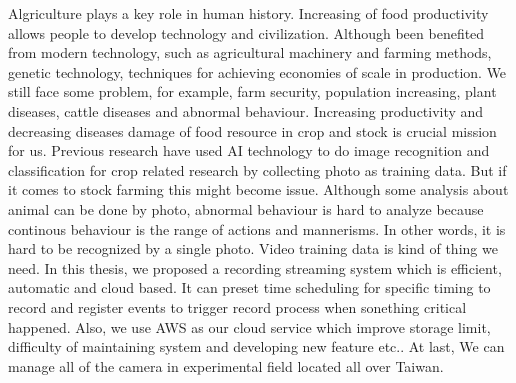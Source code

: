 \begin{abstracten}
\setcounter{page}{1}
Algriculture plays a key role in human history. Increasing of food productivity allows people to develop technology and civilization. Although been benefited from modern technology, such as agricultural machinery and farming methods, genetic technology, techniques for achieving economies of scale in production. We still face some problem, for example, farm security, population increasing, plant diseases, cattle diseases and abnormal behaviour. Increasing productivity and decreasing diseases damage of food resource in crop and stock is crucial mission for us. Previous research have used AI technology to do image recognition and classification for crop related research by collecting photo as training data. But if it comes to stock farming this might become issue. Although some analysis about animal can be done by photo, abnormal behaviour is hard to analyze because continous behaviour is the range of actions and mannerisms. In other words, it is hard to be recognized by a single photo. Video training data is kind of thing we need. In this thesis, we proposed a recording streaming system which is efficient, automatic and cloud based. It can preset time scheduling for specific timing to record and register events to trigger record process when sonething critical happened. Also, we use AWS as our cloud service which improve storage limit, difficulty of maintaining system and developing new feature etc.. At last, We can manage all of the camera in experimental field located all over Taiwan.
\end{abstracten}


